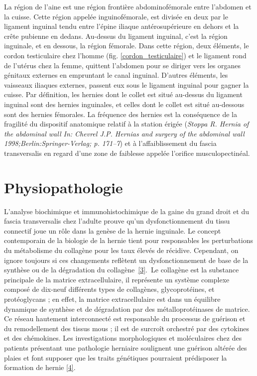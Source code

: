 \documentclass[frenc,10pt,a4paper]{article}
\begin{document}
La région de l'aine est une région frontière abdominofémorale entre
l'abdomen et la cuisse. Cette région appelée inguinofémorale, est divisée
en deux par le ligament inguinal tendu entre l'épine iliaque
antérosupérieure en dehors et la crête pubienne en dedans. Au-dessus du
ligament inguinal, c'est la région inguinale, et en dessous, la région
fémorale. Dans cette région, deux éléments, le cordon testiculaire chez
l'homme (fig. \ref{cordon_testiculaire}) et le ligament rond de l'utérus chez la femme, quittent l'abdomen pour se diriger vers les organes génitaux externes en
empruntant le canal inguinal. D'autres éléments, les vaisseaux iliaques
externes, passent eux sous le ligament inguinal pour gagner la cuisse.
Par définition, les hernies dont le collet est situé au-dessus du
ligament inguinal sont des hernies inguinales, et celles dont le collet
est situé au-dessous sont des hernies fémorales. La fréquence des
hernies est la conséquence de la fragilité du dispositif anatomique
relatif à la station érigée (\textit{Stoppa R. Hernia of the abdominal wall In: Chevrel J.P. Hernias and surgery of the abdominal wall 1998;Berlin:Springer-Verlag; p. 171–7}) et à l'affaiblissement du fascia transversalis en regard d'une zone de faiblesse appelée l'orifice musculopectinéal.



\section{Physiopathologie}

L'analyse biochimique et immunohistochimique de la gaine du grand droit
et du fascia transversalis chez l'adulte prouve qu'un dysfonctionnement
du tissu connectif joue un rôle dans la genèse de la hernie inguinale.
Le concept contemporain de la biologie de la hernie tient pour
responsables les perturbations du métabolisme du collagène pour les taux
élevés de récidive. Cependant, on ignore toujours si ces changements
reflètent un dysfonctionnement de base de la synthèse ou de la
dégradation du collagène~\hyperref[csl:3]{[3]}.~Le collagène est la
substance principale de la matrice extracellulaire, il représente un
système complexe composé de dix-neuf différents types de collagènes,
glycoprotéines, et protéoglycans ; en effet, la matrice extracellulaire
est dans un équilibre dynamique de synthèse et de dégradation par des
métalloprotéinases de matrice. Ce réseau hautement interconnecté est
responsable du processus de guérison et du remodellement des tissus mous
; il est de surcroît orchestré par des cytokines et des chémokines. Les
investigations morphologiques et moléculaires chez des patients
présentant une pathologie herniaire soulignent une guérison altérée des
plaies et font supposer que les traits génétiques pourraient prédisposer
la formation de hernie \hyperref[csl:4]{[4]}.
\end{document}
